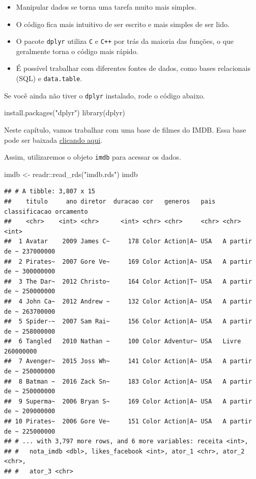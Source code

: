 \documentclass[
]{book}
\newenvironment{Shaded}{\begin{snugshade}}{\end{snugshade}}
\newcommand{\FunctionTok}[1]{\textcolor[rgb]{0.00,0.00,0.00}{#1}}
\newcommand{\NormalTok}[1]{#1}
\newcommand{\OtherTok}[1]{\textcolor[rgb]{0.56,0.35,0.01}{#1}}
\newcommand{\SpecialCharTok}[1]{\textcolor[rgb]{0.00,0.00,0.00}{#1}}
\newcommand{\StringTok}[1]{\textcolor[rgb]{0.31,0.60,0.02}{#1}}
\providecommand{\tightlist}{%
  \setlength{\itemsep}{0pt}\setlength{\parskip}{0pt}}
\begin{document}
\begin{itemize}
\tightlist
\item
  Manipular dados se torna uma tarefa muito mais simples.
\item
  O código fica mais intuitivo de ser escrito e mais simples de ser lido.
\item
  O pacote \texttt{dplyr} utiliza \texttt{C} e \texttt{C++} por trás da maioria das funções, o que geralmente torna o código mais rápido.
\item
  É possível trabalhar com diferentes fontes de dados, como bases relacionais (SQL) e \texttt{data.table}.
\end{itemize}

Se você ainda não tiver o \texttt{dplyr} instalado, rode o código abaixo.

\begin{Shaded}
\begin{Highlighting}[]
\FunctionTok{install.packages}\NormalTok{(}\StringTok{"dplyr"}\NormalTok{)}
\FunctionTok{library}\NormalTok{(dplyr)}
\end{Highlighting}
\end{Shaded}

Neste capítulo, vamos trabalhar com uma base de filmes do IMDB. Essa base pode ser baixada \href{https://github.com/curso-r/livro-material/raw/master/assets/data/imdb.rds}{clicando aqui}.

Assim, utilizaremos o objeto \texttt{imdb} para acessar os dados.

\begin{Shaded}
\begin{Highlighting}[]
\NormalTok{imdb }\OtherTok{\textless{}{-}}\NormalTok{ readr}\SpecialCharTok{::}\FunctionTok{read\_rds}\NormalTok{(}\StringTok{"imdb.rds"}\NormalTok{)}
\NormalTok{imdb}
\end{Highlighting}
\end{Shaded}

\begin{verbatim}
## # A tibble: 3,807 x 15
##    titulo     ano diretor  duracao cor   generos   pais  classificacao orcamento
##    <chr>    <int> <chr>      <int> <chr> <chr>     <chr> <chr>             <int>
##  1 Avatar    2009 James C~     178 Color Action|A~ USA   A partir de ~ 237000000
##  2 Pirates~  2007 Gore Ve~     169 Color Action|A~ USA   A partir de ~ 300000000
##  3 The Dar~  2012 Christo~     164 Color Action|T~ USA   A partir de ~ 250000000
##  4 John Ca~  2012 Andrew ~     132 Color Action|A~ USA   A partir de ~ 263700000
##  5 Spider-~  2007 Sam Rai~     156 Color Action|A~ USA   A partir de ~ 258000000
##  6 Tangled   2010 Nathan ~     100 Color Adventur~ USA   Livre         260000000
##  7 Avenger~  2015 Joss Wh~     141 Color Action|A~ USA   A partir de ~ 250000000
##  8 Batman ~  2016 Zack Sn~     183 Color Action|A~ USA   A partir de ~ 250000000
##  9 Superma~  2006 Bryan S~     169 Color Action|A~ USA   A partir de ~ 209000000
## 10 Pirates~  2006 Gore Ve~     151 Color Action|A~ USA   A partir de ~ 225000000
## # ... with 3,797 more rows, and 6 more variables: receita <int>,
## #   nota_imdb <dbl>, likes_facebook <int>, ator_1 <chr>, ator_2 <chr>,
## #   ator_3 <chr>
\end{verbatim}
\end{document}

